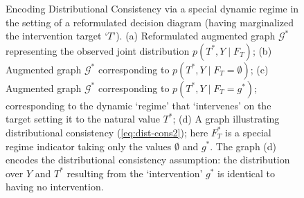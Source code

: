 \documentclass[11pt]{article}
\newcommand{\G}{{\mathscr G}}
\begin{document}
{\begin{figure}
\begin{tikzpicture}
\end{tikzpicture}
\caption{Encoding Distributional Consistency via a special dynamic regime in the setting of a reformulated decision diagram (having marginalized the intervention target `$T$').
(a) Reformulated augmented graph ${\G}^*$ representing the observed joint distribution $p(T^*,Y \mid F_T)$; 
(b) Augmented graph ${\G}^*$ corresponding to $p(T^*,Y \mid F_T=\emptyset)$;
(c) Augmented graph ${\G}^*$ corresponding to $p(T^*,Y \mid F_T=g^*)$; corresponding to the dynamic `regime' that `intervenes' on the target  setting it to 
the natural value $T^*$; (d) A graph illustrating distributional consistency (\ref{eq:dist-cons2}); here $F^*_T$ is a special regime indicator taking only the values $\emptyset$ and $g^*$. The graph (d) encodes the distributional consistency assumption: the distribution over $Y$ and $T^*$ resulting from the `intervention' $g^*$ is identical to having no intervention.
\label{fig:consistency-phil}}
\end{figure}

}
\end{document}
